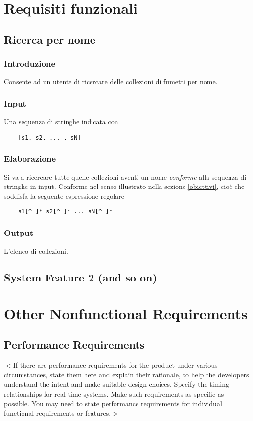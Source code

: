 \documentclass{scrreprt}
\begin{document}
\chapter{Requisiti funzionali}

\section{Ricerca per nome}

\subsection{Introduzione}
Consente ad un utente di ricercare delle collezioni di fumetti per nome.

\subsection{Input}
Una sequenza di stringhe indicata con 
\begin{verbatim}
    [s1, s2, ... , sN]
\end{verbatim}

\subsection{Elaborazione}
Si va a ricercare tutte quelle collezioni aventi un nome \emph{conforme} alla sequenza di stringhe in input.
Conforme nel senso illustrato nella sezione \ref*{obiettivi}, cioè che soddisfa la seguente espressione regolare
\begin{verbatim}
    s1[^ ]* s2[^ ]* ... sN[^ ]*
\end{verbatim}

\subsection{Output}
L'elenco di collezioni.

\section{System Feature 2 (and so on)}


\chapter{Other Nonfunctional Requirements}

\section{Performance Requirements}
$<$If there are performance requirements for the product under various 
circumstances, state them here and explain their rationale, to help the 
developers understand the intent and make suitable design choices. Specify the 
timing relationships for real time systems. Make such requirements as specific 
as possible. You may need to state performance requirements for individual 
functional requirements or features.$>$
\end{document}
